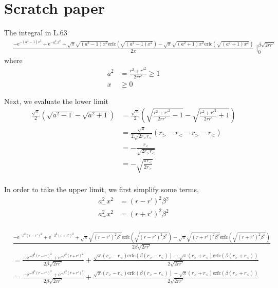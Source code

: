 \documentclass[paper=a4, fontsize=11pt]{article} %
\numberwithin{equation}{section} %
\numberwithin{figure}{section} %
\numberwithin{table}{section} %
\newcommand{\re}{{\mathrm{e}}}
\newcommand{\rerfc}{{\mathrm{erfc}}}
\begin{document}
\section{Scratch paper}
The integral in L.63
\begin{equation}
\begin{split}
&\frac{-\re^{-(a^2 -1) x^2} + \re^{-a_{+}^2 x^2} +\sqrt{\pi}\sqrt{(a^2 -1)x^2}\rerfc\left(\sqrt{(a^2 -1)x^2}\right) - \sqrt{\pi}\sqrt{(a^2 +1)x^2}\rerfc\left(\sqrt{(a^2 +1)x^2}\right) }{2x} \mid_0^{\beta\sqrt{2rr'}} \nonumber
\end{split}
\end{equation}
where
\begin{equation}
\begin{split}
a^2 &= \frac{r^2 + r'^2}{2rr'} \geq 1 \\
x &\geq 0
\end{split}
\end{equation}

Next, we evaluate the lower limit
\begin{equation}
\begin{split}
\frac{\sqrt{\pi}}{2}\left(\sqrt{a^2 -1} - \sqrt{a^2 + 1}\right)
&= \frac{\sqrt{\pi}}{2}\left(\sqrt{\frac{r^2 + r'^2}{2rr'} -1} - \sqrt{\frac{r^2 + r'^2}{2rr'} + 1}\right)\\
&= \frac{\sqrt{\pi}}{2\sqrt{2r_>r_<}} \left(r_> - r_< - r_> - r_<\right)\\
&= -\frac{r_<}{\sqrt{2r_>r_<}} \\
&= -\sqrt{\frac{\pi r_<}{2r_>}} \\
\end{split}
\end{equation}

In order to take the upper limit, we first simplify some terms,
\begin{equation}
\begin{split}
a_{-}^2x^2
&= (r-r')^2 \beta^2 \\
a_{+}^2x^2
&= (r+r')^2 \beta^2 \\
\end{split}
\end{equation}

\begin{equation}
\begin{split}
&\frac{-\re^{-\beta^2(r-r')^2 } + \re^{-\beta^2(r+r')^2 } +\sqrt{\pi}\sqrt{(r-r')^2 \beta^2}\rerfc\left(\sqrt{(r-r')^2 \beta^2}\right) - \sqrt{\pi}\sqrt{(r+r')^2 \beta^2}\rerfc\left(\sqrt{(r+r')^2 \beta^2}\right) }{2\beta \sqrt{2 r r'}} \\
&= \frac{-\re^{-\beta^2(r-r')^2 } + \re^{-\beta^2(r+r')^2 }}{2\beta \sqrt{2 r r'}} + \frac{\sqrt{\pi}(r_> - r_<)\rerfc\left(\beta(r_> - r_<)\right) - \sqrt{\pi}(r_> + r_<)\rerfc\left(\beta(r_> + r_<)\right)}{2\sqrt{2rr'}}\\
&= \frac{-\re^{-\beta^2(r-r')^2 } + \re^{-\beta^2(r+r')^2 }}{2\beta \sqrt{2 r r'}} + \frac{\sqrt{\pi}(r_> - r_<)\rerfc\left(\beta(r_> - r_<)\right) - \sqrt{\pi}(r_> + r_<)\rerfc\left(\beta(r_> + r_<)\right)}{2\sqrt{2rr'}} \nonumber
\end{split}
\end{equation}
\end{document}
